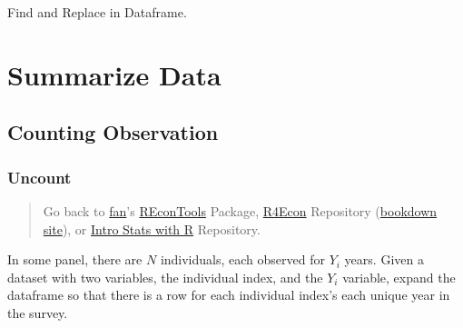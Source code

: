 \documentclass[
]{book}
\newenvironment{Shaded}{\begin{snugshade}}{\end{snugshade}}
\newcommand{\CommentTok}[1]{\textcolor[rgb]{0.56,0.35,0.01}{\textit{#1}}}
\newcommand{\KeywordTok}[1]{\textcolor[rgb]{0.13,0.29,0.53}{\textbf{#1}}}
\newcommand{\NormalTok}[1]{#1}
\newcommand{\OperatorTok}[1]{\textcolor[rgb]{0.81,0.36,0.00}{\textbf{#1}}}
\newcommand{\StringTok}[1]{\textcolor[rgb]{0.31,0.60,0.02}{#1}}
\begin{document}
Find and Replace in Dataframe.

\begin{Shaded}
\end{Shaded}

\hypertarget{summarize-data}{%
\chapter{Summarize Data}\label{summarize-data}}

\hypertarget{counting-observation}{%
\section{Counting Observation}\label{counting-observation}}

\hypertarget{uncount}{%
\subsection{Uncount}\label{uncount}}

\begin{quote}
Go back to \href{http://fanwangecon.github.io/}{fan}'s \href{https://fanwangecon.github.io/REconTools/}{REconTools} Package, \href{https://fanwangecon.github.io/R4Econ/}{R4Econ} Repository (\href{https://fanwangecon.github.io/R4Econ/bookdown}{bookdown site}), or \href{https://fanwangecon.github.io/Stat4Econ/}{Intro Stats with R} Repository.
\end{quote}

In some panel, there are \(N\) individuals, each observed for \(Y_i\) years. Given a dataset with two variables, the individual index, and the \(Y_i\) variable, expand the dataframe so that there is a row for each individual index's each unique year in the survey.
\end{document}
